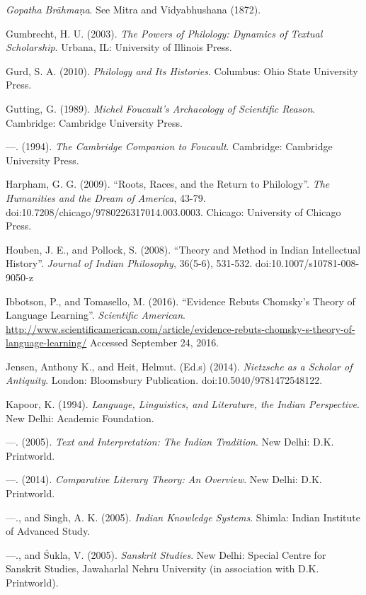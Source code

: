 \begin{thebibliography}{99}
  \textit{Gopatha Brāhmaṇa}. See Mitra and Vidyabhushana (1872).

  Gumbrecht, H. U. (2003). \textit{The Powers of Philology: Dynamics of Textual Scholarship}. Urbana, IL: University of Illinois Press.

  Gurd, S. A. (2010). \textit{Philology and Its Histories}. Columbus: Ohio State University Press.

  Gutting, G. (1989). \textit{Michel Foucault's Archaeology of Scientific Reason}. Cambridge: Cambridge University Press.

  —. (1994). \textit{The Cambridge Companion to Foucault}. Cambridge: Cambridge University Press.

  Harpham, G. G. (2009). “Roots, Races, and the Return to Philology”. \textit{The Humanities and the Dream of America}, 43-79. doi:10.7208/chicago/9780226317014.003.0003. Chicago: University of Chicago Press.

  Houben, J. E., and Pollock, S. (2008). “Theory and Method in Indian Intellectual History”. \textit{Journal of Indian Philosophy}, 36(5-6), 531-532. doi:10.1007/s10781-008-9050-z

  Ibbotson, P., and Tomasello, M. (2016). “Evidence Rebuts Chomsky's Theory of Language Learning”. \textit{Scientific American}. \url{http://www.scientificamerican.com/article/evidence-rebuts-chomsky-s-theory-of-language-learning/} Accessed September 24, 2016.

  Jensen, Anthony K., and Heit, Helmut. (Ed.s) (2014). \textit{Nietzsche as a Scholar of Antiquity}. London: Bloomsbury Publication. doi:10.5040/9781472548122.

  Kapoor, K. (1994). \textit{Language, Linguistics, and Literature, the Indian Perspective}. New Delhi: Academic Foundation.

  —. (2005). \textit{Text and Interpretation: The Indian Tradition}. New Delhi: D.K. Printworld.

  —. (2014). \textit{Comparative Literary Theory: An Overview}. New Delhi: D.K. Printworld.

  —., and Singh, A. K. (2005). \textit{Indian Knowledge Systems}. Shimla: Indian Institute of Advanced Study.

  —., and Śukla, V. (2005). \textit{Sanskrit Studies}. New Delhi: Special Centre for Sanskrit Studies, Jawaharlal Nehru University (in association with D.K. Printworld).


\end{thebibliography}
